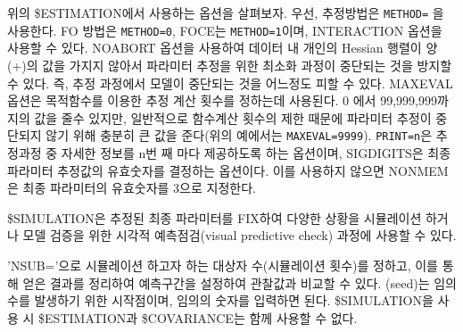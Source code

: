 \documentclass[
  10pt,
  krantz2,
  a4paper]{krantz}
\newenvironment{Shaded}{\begin{snugshade}}{\end{snugshade}}
\newcommand{\DecValTok}[1]{\textcolor[rgb]{0.00,0.00,0.81}{#1}}
\newcommand{\KeywordTok}[1]{\textcolor[rgb]{0.13,0.29,0.53}{\textbf{#1}}}
\newcommand{\NormalTok}[1]{#1}
\newcommand{\OperatorTok}[1]{\textcolor[rgb]{0.81,0.36,0.00}{\textbf{#1}}}
\theoremstyle{definition}
\theoremstyle{definition}
\theoremstyle{definition}
\theoremstyle{remark}
\begin{document}
\begin{Shaded}
\end{Shaded}

위의 \$ESTIMATION에서 사용하는 옵션을 살펴보자. 우선, 추정방법은 \texttt{METHOD=} 을 사용한다. FO 방법은 \texttt{METHOD=0}, FOCE는 \texttt{METHOD=1}이며, INTERACTION 옵션을 사용할 수 있다. NOABORT 옵션을 사용하여 데이터 내 개인의 Hessian 행렬이 양(+)의 값을 가지지 않아서 파라미터 추정을 위한 최소화 과정이 중단되는 것을 방지할 수 있다. 즉, 추정 과정에서 모델이 중단되는 것을 어느정도 피할 수 있다. MAXEVAL 옵션은 목적함수를 이용한 추정 계산 횟수를 정하는데 사용된다. 0 에서 99,999,999까지의 값을 줄수 있지만, 일반적으로 함수계산 횟수의 제한 때문에 파라미터 추정이 중단되지 않기 위해 충분히 큰 값을 준다(위의 예에서는 \texttt{MAXEVAL=9999}). \texttt{PRINT=n}은 추정과정 중 자세한 정보를 n번 째 마다 제공하도록 하는 옵션이며, SIGDIGITS은 최종 파라미터 추정값의 유효숫자를 결정하는 옵션이다. 이를 사용하지 않으면 NONMEM은 최종 파라미터의 유효숫자를 3으로 지정한다.

\$SIMULATION은 추정된 최종 파라미터를 FIX하여 다양한 상황을 시뮬레이션 하거나 모델 검증을 위한 시각적 예측점검(visual predictive check) 과정에 사용할 수 있다.

\begin{Shaded}
\end{Shaded}

'NSUB='으로 시뮬레이션 하고자 하는 대상자 수(시뮬레이션 횟수)를 정하고, 이를 통해 얻은 결과를 정리하여 예측구간을 설정하여 관찰값과 비교할 수 있다. (seed)는 임의 수를 발생하기 위한 시작점이며, 임의의 숫자를 입력하면 된다. \$SIMULATION을 사용 시 \$ESTIMATION과 \$COVARIANCE는 함께 사용할 수 없다.
\end{document}
